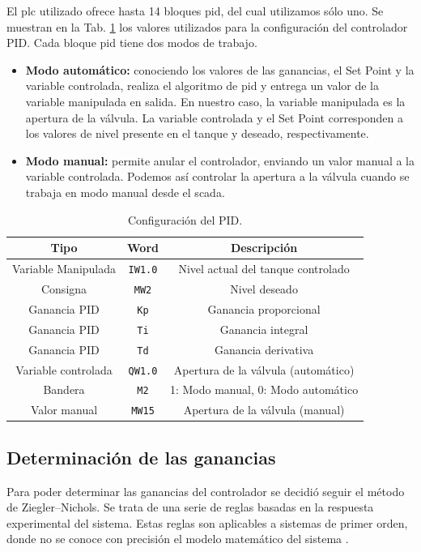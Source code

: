 El \gls{plc} utilizado ofrece hasta 14 bloques \gls{pid}, del cual utilizamos
sólo uno.
Se muestran en la Tab. \ref{table:controladorpid} los valores utilizados para
la configuración del controlador PID.
Cada bloque \gls{pid} tiene dos modos de trabajo.
\begin{itemize}
 \item \textbf{Modo automático:} conociendo los valores de las ganancias, el
Set Point y la variable controlada, realiza el algoritmo de \gls{pid} y entrega
un valor de la variable manipulada en salida.
En nuestro caso, la variable manipulada es la apertura de la válvula.
La variable controlada y el Set Point corresponden a los valores de nivel
presente en el tanque y deseado, respectivamente.
 \item \textbf{Modo manual:} permite anular el controlador, enviando un valor
manual a la variable controlada.
Podemos así controlar la apertura a la válvula cuando se
trabaja en modo manual desde el \gls{scada}.

\end{itemize}

\begin{table}[!t]
\renewcommand{\arraystretch}{1.3}
\centering
\begin{tabular}{c||c||c}
\hline
\bfseries Tipo & \bfseries Word  & \bfseries Descripción\\
\hline \hline
Variable Manipulada & \verb|IW1.0|  & Nivel actual del tanque controlado\\
Consigna & \verb|MW2|  & Nivel deseado\\
Ganancia PID & \verb|Kp|  & Ganancia proporcional\\
Ganancia PID & \verb|Ti|  & Ganancia integral\\
Ganancia PID & \verb|Td|  & Ganancia derivativa\\
Variable controlada & \verb|QW1.0|  &  Apertura de la válvula (automático)\\
Bandera & \verb|M2|  & 1: Modo manual, 0: Modo automático \\
Valor manual & \verb|MW15|  & Apertura de la válvula (manual)\\
\hline
\end{tabular}
\caption{Configuración del PID.}
\label{table:controladorpid}
\end{table}

\subsection{Determinación de las ganancias}
\label{subsec:ZiegerNichols}
Para poder determinar las ganancias del controlador se decidió seguir el método
de Ziegler–Nichols.
Se trata de una serie de reglas basadas en la respuesta experimental
del sistema.
Estas reglas son aplicables a sistemas de primer orden, donde no se conoce con
precisión el modelo matemático del sistema \cite{bib:Ogata}.

